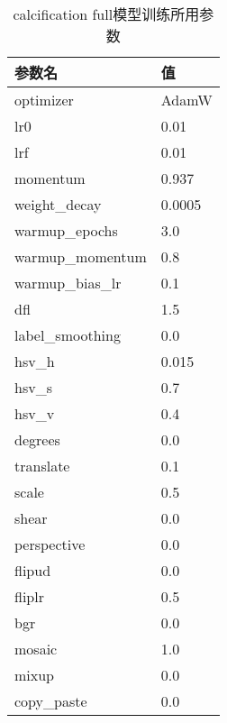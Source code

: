   \begin{table}
    \centering
  \begin{tabular}{ll}\toprule
     参数名&值\\\midrule
     optimizer&AdamW\\
     lr0& 0.01\\
     lrf& 0.01\\
     momentum& 0.937\\
     weight\_decay& 0.0005\\
     warmup\_epochs& 3.0\\
     warmup\_momentum& 0.8\\
     warmup\_bias\_lr& 0.1\\
     dfl& 1.5\\
     label\_smoothing& 0.0\\
   
     hsv\_h& 0.015\\
     hsv\_s& 0.7\\
     hsv\_v& 0.4\\
     degrees& 0.0\\
     translate& 0.1\\
     scale& 0.5\\
     shear& 0.0\\
     perspective& 0.0\\
     flipud& 0.0\\
     fliplr& 0.5\\
     bgr& 0.0\\
     mosaic& 1.0\\
     mixup& 0.0\\
     copy\_paste& 0.0\\
     \bottomrule
    \end{tabular}
    \caption{calcification full模型训练所用参数}
    \end{table}
  
